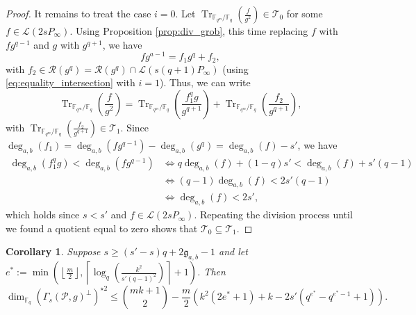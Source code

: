 \documentclass[a4paper]{article}
\newtheorem{coro}[thm]{Corollary}
\theoremstyle{definition}
\theoremstyle{remark}
\newcommand{\calP}{\mathcal{P}}
\newcommand{\calL}{\mathcal{L}}
\newcommand{\calR}{\mathcal{R}}
\newcommand{\calT}{\mathcal{T}}
\newcommand{\fq}{\mathbb{F}_{q}}
\newcommand{\Tr}[1]{\operatorname{Tr}_{\mathbb{F}_{q^m}/\fq}\left(#1\right)}
\newcommand{\degab}[1]{\deg_{a,b}\left(#1\right)}
\begin{document}
\begin{proof}
\noindent It remains to treat the case $i=0$. Let $\Tr{\frac{f}{g^2}} \in \calT_0$ for some $f \in \calL(2sP_\infty)$. Using Proposition \ref{prop:div_grob}, this time replacing $f$ with $fg^{q-1}$ and $g$ with $g^{q+1}$, we have
$$fg^{a-1} = f_1g^q + f_2,$$ with $f_2 \in \calR(g^q) = \calR(g^q) \cap \calL(s(q+1)P_\infty)$ (using \eqref{eq:equality_intersection} with $i=1$).
Thus, we can write
    $$ \Tr{\frac{f}{g^2}} = \Tr{\frac{f_1^qg}{g^{q+1}}}  + \Tr{\frac{f_2}{g^{q+1}}}, $$
with $\Tr{\frac{f_2}{g^{q+1}}} \in \calT_1$. Since $\degab{f_1} = \degab{fg^{q-1}} - \degab{g^q} = \degab{f}-s'$, we have 
\begin{align*}
     \degab{f_1^qg} < \degab{fg^{q-1}} & \iff q\degab{f} +(1-q)s' < \degab{f} + s'(q-1)\\
                                               & \iff (q-1)\degab{f} < 2s'(q-1)\\
                                               & \iff \degab{f} < 2s',
\end{align*}
which holds since $s<s'$ and $f \in \calL(2sP_\infty)$. Repeating the division process until we found a quotient equal to zero shows that $\calT_0 \subseteq \calT_1$.
\end{proof}

\begin{coro} \label{coro:bound_with_T_i's_inclusion}
Suppose $s \geq (s'-s)q+2\mathfrak{g}_{a,b}-1$ and let $e^* := \min\left(\left\lfloor \frac{m}{2} \right\rfloor, \left\lceil \log_q\left(\frac{k^2}{s'(q-1)^2}\right)\right\rceil+1\right)$. Then
$$\dim_{\fq} (\Gamma_s(\calP,g)^{\perp})^{\star 2}\leq \binom{mk+1}{2} - \dfrac{m}{2}(k^2(2e^*+1)+k-2s'(q^{e^*}-q^{e^*-1}+1)). $$
\end{coro}
\end{document}

